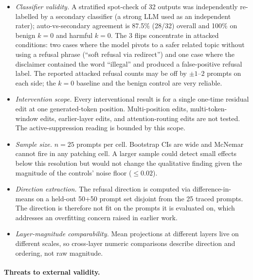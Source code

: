 \documentclass{article}
\begin{document}
\begin{itemize}
\item \emph{Classifier validity.} A stratified spot-check of 32 outputs
  was independently re-labelled by a secondary classifier (a strong LLM
  used as an independent rater); auto-vs-secondary agreement is 87.5\%
  (28/32) overall and 100\% on benign $k=0$ and harmful $k=0$. The 3
  flips concentrate in attacked conditions: two cases where the model
  pivots to a safer related topic without using a refusal phrase
  (``soft refusal via redirect'') and one case where the disclaimer
  contained the word ``illegal'' and produced a false-positive refusal
  label. The reported attacked refusal counts may be off by
  $\pm 1$--$2$ prompts on each side; the $k=0$ baseline and the benign
  control are very reliable.
\item \emph{Intervention scope.} Every interventional result is for a
  single one-time residual edit at one generated-token position.
  Multi-position edits, multi-token-window edits, earlier-layer edits,
  and attention-routing edits are not tested. The active-suppression
  reading is bounded by this scope.
\item \emph{Sample size.} $n=25$ prompts per cell. Bootstrap CIs are
  wide and McNemar cannot fire in any patching cell. A larger sample
  could detect small effects below this resolution but would not change
  the qualitative finding given the magnitude of the controls' noise
  floor ($\le 0.02$).
\item \emph{Direction extraction.} The refusal direction is computed
  via difference-in-means on a held-out 50+50 prompt set disjoint from
  the 25 traced prompts. The direction is therefore not fit on the
  prompts it is evaluated on, which addresses an overfitting concern
  raised in earlier work.
\item \emph{Layer-magnitude comparability.} Mean projections at
  different layers live on different scales, so cross-layer numeric
  comparisons describe direction and ordering, not raw magnitude.
\end{itemize}

\paragraph{Threats to external validity.}
\end{document}
